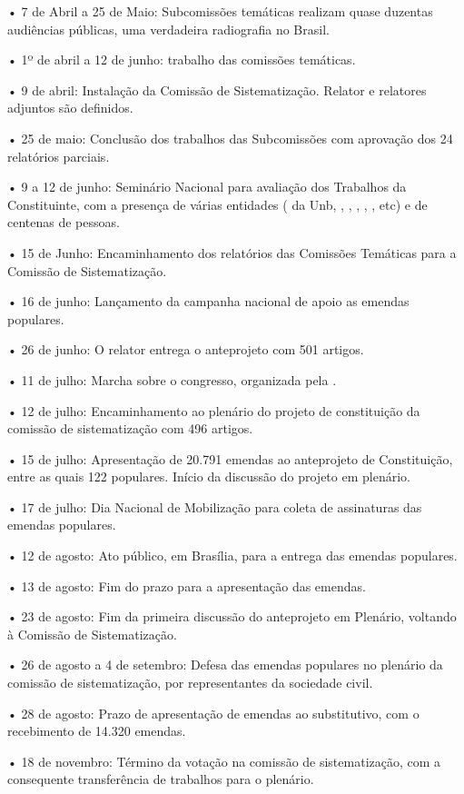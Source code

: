 • 7 de Abril a 25 de Maio: Subcomissões temáticas realizam quase
duzentas audiências públicas, uma verdadeira radiografia no Brasil.

• 1º de abril a 12 de junho: trabalho das comissões temáticas.

• 9 de abril: Instalação da Comissão de Sistematização. Relator e
relatores adjuntos são definidos.

• 25 de maio: Conclusão dos trabalhos das Subcomissões com aprovação dos
24 relatórios parciais.

• 9 a 12 de junho: Seminário Nacional para avaliação dos Trabalhos da
Constituinte, com a presença de várias entidades ( da Unb, ,
, , , , etc) e de centenas de pessoas.

• 15 de Junho: Encaminhamento dos relatórios das Comissões Temáticas
para a Comissão de Sistematização.

• 16 de junho: Lançamento da campanha nacional de apoio as emendas
populares.

• 26 de junho: O relator entrega o anteprojeto com 501 artigos.

• 11 de julho: Marcha sobre o congresso, organizada pela .

• 12 de julho: Encaminhamento ao plenário do projeto de constituição da
comissão de sistematização com 496 artigos.

• 15 de julho: Apresentação de 20.791 emendas ao anteprojeto de
Constituição, entre as quais 122 populares. Início da discussão do
projeto em plenário.

• 17 de julho: Dia Nacional de Mobilização para coleta de assinaturas
das emendas populares.

• 12 de agosto: Ato público, em Brasília, para a entrega das emendas
populares.

• 13 de agosto: Fim do prazo para a apresentação das emendas.

• 23 de agosto: Fim da primeira discussão do anteprojeto em Plenário,
voltando à Comissão de Sistematização.

• 26 de agosto a 4 de setembro: Defesa das emendas populares no plenário
da comissão de sistematização, por representantes da sociedade civil.

• 28 de agosto: Prazo de apresentação de emendas ao substitutivo, com o
recebimento de 14.320 emendas.

• 18 de novembro: Término da votação na comissão de sistematização, com
a consequente transferência de trabalhos para o plenário.

